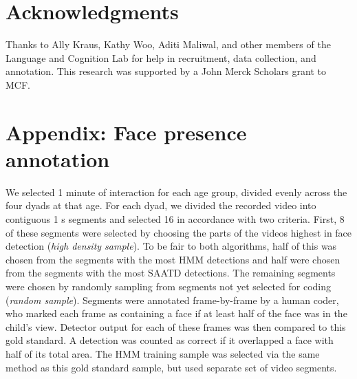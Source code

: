 \documentclass[10pt,letterpaper]{article}
\begin{document}
\section{Acknowledgments}

Thanks to Ally Kraus, Kathy Woo, Aditi Maliwal, and other members of the Language and Cognition Lab for help in recruitment, data collection, and annotation. This research was supported by a John Merck Scholars grant to MCF.



\setlength{\bibleftmargin}{.125in} \setlength{\bibindent}{-\bibleftmargin}



\section{Appendix: Face presence annotation}

We selected 1 minute of interaction for each age group, divided evenly across the four dyads at that age. For each dyad, we divided the recorded video into contiguous 1 s segments and selected 16 in accordance with two criteria. First, 8 of these segments were selected by choosing the parts of the videos highest in face detection (\emph{high density sample}). To be fair to both algorithms, half of this was chosen from the segments with the most HMM detections and half were chosen from the segments with the most SAATD detections. The remaining segments were chosen by randomly sampling from segments not yet selected for coding (\emph{random sample}). 
Segments were annotated frame-by-frame by a human coder, who marked each frame as containing a face if at least half of the face was in the child's view. Detector output for each of these frames was then compared to this gold standard. A detection was counted as correct if it overlapped a face with half of its total area. The HMM training sample was selected via the same method as this gold standard sample, but used separate set of video segments.

\end{document}
